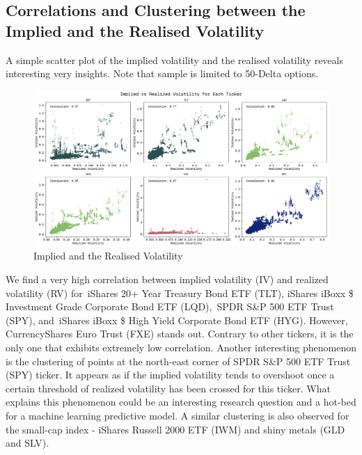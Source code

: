\subsection{Correlations and Clustering between the Implied and the Realised Volatility}
A simple scatter plot of the implied volatility and the realised volatility reveals interesting very insights. Note that sample is limited to 50-Delta options.

\begin{figure}[H]
    \centering
    \includegraphics[width=1\textwidth]{images/iv_and_rv_batch1.png}
    \caption{Implied and the Realised Volatility}
    \label{fig:iv_and_rv1}
\end{figure}

We find a very high correlation between implied volatility (IV) and realized volatility (RV) for iShares 20+ Year Treasury Bond ETF (TLT), iShares iBoxx \$ Investment Grade Corporate Bond ETF (LQD), SPDR S\&P 500 ETF Trust (SPY), and iShares iBoxx \$ High Yield Corporate Bond ETF (HYG). However, CurrencyShares Euro Trust (FXE) stands out. Contrary to other tickers, it is the only one that exhibits extremely low correlation. Another interesting phenomenon is the clustering of points at the north-east corner of SPDR S\&P 500 ETF Trust (SPY) ticker. It appears as if the implied volatility tends to overshoot once a certain threshold of realized volatility has been crossed for this ticker. What explains this phenomenon could be an interesting research question and a hot-bed for a machine learning predictive model. A similar clustering is also observed for the small-cap index - iShares Russell 2000 ETF (IWM) and shiny metals (GLD and SLV).

